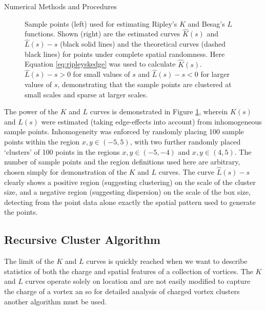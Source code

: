 \begin{chapter}{\label{cha:numerics}Numerical Methods and Procedures}
\begin{figure}
\begin{minipage}{0.5\linewidth}
%
  \end{minipage}%
  \caption{Sample points (left) used for estimating Ripley's $K$ and Besag's $L$ functions. Shown (right) are the estimated curves $\hat{K}(s)$ and $\hat{L}(s)-s$ (black solid lines) and the theoretical curves (dashed black lines) for points under complete spatial randomness. Here Equation \ref{eq:ripleyskedge} was used to calculate $\hat K(s)$. $\hat{L}(s)-s > 0$ for small values of $s$ and $\hat{L}(s)-s < 0$ for larger values of $s$, demonstrating that the sample points are clustered at small scales and sparse at larger scales.\label{fig:ripleyexample}}
 \end{figure}

  The power of the $K$ and $L$ curves is demonstrated in Figure \ref{fig:ripleyexample}, wherein $K(s)$ and $L(s)$ were estimated (taking edge-effects into account) from inhomogeneous sample points. Inhomogeneity was enforced by randomly placing 100 sample points within the region $x,y \in (-5,5)$, with two further randomly placed `clusters' of 100 points in the regions $x,y \in (-5,-4)$ and $x,y \in (4,5)$. The number of sample points and the region definitions used here are arbitrary, chosen simply for demonstration of the $K$ and $L$ curves. The curve $\hat{L}(s)-s$ clearly shows a positive region (suggesting clustering) on the scale of the cluster size, and a negative region (suggesting dispersion) on the scale of the box size, detecting from the point data alone exactly the spatial pattern used to generate the points.

  
\subsection{\label{section:reevesalgorithm} Recursive Cluster Algorithm }
The limit of the $K$ and $L$ curves is quickly reached when we want to describe statistics of both the charge and spatial features of a collection of vortices. The $K$ and $L$ curves operate solely on location and are not easily modified to capture the charge of a vortex an so for detailed analysis of charged vortex clusters another algorithm must be used.


\end{chapter}
